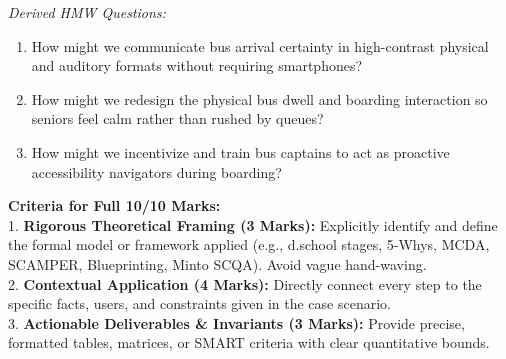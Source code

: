 \begin{solbox}
\textit{Derived HMW Questions:}
\begin{enumerate}[label=HMW \arabic*:]
    \item How might we communicate bus arrival certainty in high-contrast physical and auditory formats without requiring smartphones?
    \item How might we redesign the physical bus dwell and boarding interaction so seniors feel calm rather than rushed by queues?
    \item How might we incentivize and train bus captains to act as proactive accessibility navigators during boarding?
\end{enumerate}
\end{solbox}

\begin{examinertip}
\textbf{Criteria for Full 10/10 Marks:}\\
1. \textbf{Rigorous Theoretical Framing (3 Marks):} Explicitly identify and define the formal model or framework applied (e.g., d.school stages, 5-Whys, MCDA, SCAMPER, Blueprinting, Minto SCQA). Avoid vague hand-waving.\\
2. \textbf{Contextual Application (4 Marks):} Directly connect every step to the specific facts, users, and constraints given in the case scenario.\\
3. \textbf{Actionable Deliverables \& Invariants (3 Marks):} Provide precise, formatted tables, matrices, or SMART criteria with clear quantitative bounds.
\end{examinertip}
